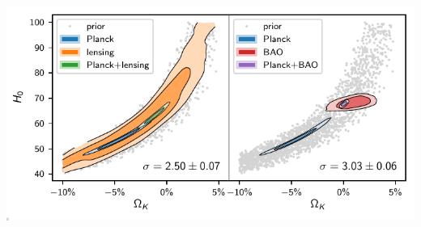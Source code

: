 \documentclass[aspectratio=169]{beamer}
\begin{document}
\begin{frame}
\begin{columns}
        \includegraphics[width=\textwidth]{figures/omegak_H0_2.pdf}
    \end{columns}
\end{frame}
\end{document}
